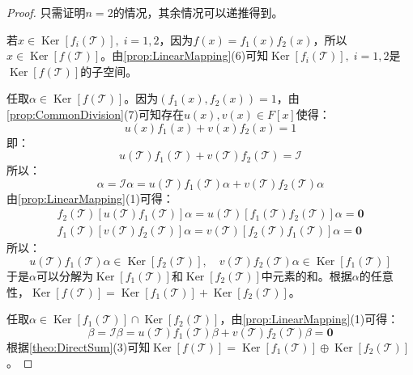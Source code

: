 \begin{proof}
	只需证明$n=2$的情况，其余情况可以递推得到。\par
	若$x\in\operatorname{Ker}[f_i(\mathcal{T})],\;i=1,2$，因为$f(x)=f_1(x)f_2(x)$，所以$x\in\operatorname{Ker}[f(\mathcal{T})]$。由\cref{prop:LinearMapping}(6)可知$\operatorname{Ker}[f_i(\mathcal{T})],\;i=1,2$是$\operatorname{Ker}[f(\mathcal{T})]$的子空间。\par
	任取$\alpha\in\operatorname{Ker}[f(\mathcal{T})]$。因为$(f_1(x),f_2(x))=1$，由\cref{prop:CommonDivision}(7)可知存在$u(x),v(x)\in F[x]$使得：
	\begin{equation*}
		u(x)f_1(x)+v(x)f_2(x)=1
	\end{equation*}
	即：
	\begin{equation*}
		u(\mathcal{T})f_1(\mathcal{T})+v(\mathcal{T})f_2(\mathcal{T})=\mathcal{I}
	\end{equation*}
	所以：
	\begin{equation*}
		\alpha=\mathcal{I}\alpha=u(\mathcal{T})f_1(\mathcal{T})\alpha+v(\mathcal{T})f_2(\mathcal{T})\alpha
	\end{equation*}
	由\cref{prop:LinearMapping}(1)可得：
	\begin{gather*}
		f_2(\mathcal{T})[u(\mathcal{T})f_1(\mathcal{T})]\alpha=u(\mathcal{T})[f_1(\mathcal{T})f_2(\mathcal{T})]\alpha=\mathbf{0} \\ f_1(\mathcal{T})[v(\mathcal{T})f_2(\mathcal{T})]\alpha=v(\mathcal{T})[f_2(\mathcal{T})f_1(\mathcal{T})]\alpha=\mathbf{0}
	\end{gather*}
	所以：
	\begin{equation*}
		u(\mathcal{T})f_1(\mathcal{T})\alpha\in\operatorname{Ker}[f_2(\mathcal{T})],\quad v(\mathcal{T})f_2(\mathcal{T})\alpha\in\operatorname{Ker}[f_1(\mathcal{T})]
	\end{equation*}
	于是$\alpha$可以分解为$\operatorname{Ker}[f_1(\mathcal{T})]$和$\operatorname{Ker}[f_2(\mathcal{T})]$中元素的和。根据$\alpha$的任意性，$\operatorname{Ker}[f(\mathcal{T})]=\operatorname{Ker}[f_1(\mathcal{T})]+\operatorname{Ker}[f_2(\mathcal{T})]$。\par
	任取$\alpha\in\operatorname{Ker}[f_1(\mathcal{T})]\cap\operatorname{Ker}[f_2(\mathcal{T})]$，由\cref{prop:LinearMapping}(1)可得：
	\begin{equation*}
		\beta=\mathcal{I}\beta=u(\mathcal{T})f_1(\mathcal{T})\beta+v(\mathcal{T})f_2(\mathcal{T})\beta=\mathbf{0}
	\end{equation*}
	根据\cref{theo:DirectSum}(3)可知$\operatorname{Ker}[f(\mathcal{T})]=\operatorname{Ker}[f_1(\mathcal{T})]\oplus\operatorname{Ker}[f_2(\mathcal{T})]$。
\end{proof}
